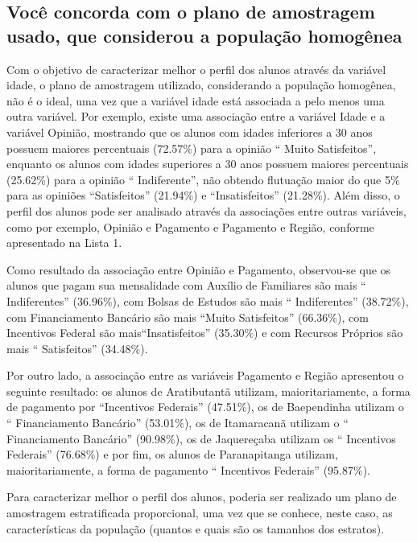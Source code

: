 \subsection{Você concorda com o plano de amostragem usado, que considerou a população homogênea}
	
	Com o objetivo de caracterizar melhor o perfil dos alunos através da
	variável idade, o plano de amostragem utilizado, considerando a
	população homogênea, não é o ideal, uma vez que a variável idade está
	associada a pelo menos uma outra variável. Por exemplo, existe uma
	associação entre a variável Idade e a variável Opinião, mostrando que os
	alunos com idades inferiores a 30 anos possuem maiores percentuais
	(\num{72,57}\%) para a opinião `` Muito Satisfeitos'', enquanto os 
    alunos com idades superiores
	a 30 anos possuem maiores percentuais (\num{25,62}\%) para a opinião
    `` Indiferente'', não obtendo flutuação
	maior do que 5\% para as opiniões ``Satisfeitos'' (\num{21,94}\%) 
    e ``Insatisfeitos'' (\num{21,28}\%). Além disso, o perfil dos
	alunos pode ser analisado através da associações entre outras variáveis,
	como por exemplo, Opinião e Pagamento e Pagamento e Região, conforme
	apresentado na Lista 1. 

	Como resultado da associação entre Opinião e Pagamento, observou-se que
	os alunos que pagam sua mensalidade com Auxílio de Familiares são mais
	`` Indiferentes'' (\num{36,96}\%), com Bolsas
	de Estudos são mais `` Indiferentes''
	(\num{38,72}\%), com Financiamento Bancário são mais ``Muito Satisfeitos''
    (\num{66,36}\%), com Incentivos Federal são mais``Insatisfeitos'' (\num{35,30}\%) e com
	Recursos Próprios são mais ``
	Satisfeitos'' (\num{34,48}\%).

	Por outro lado, a associação entre as variáveis Pagamento e Região
	apresentou o seguinte resultado: os alunos de Aratibutantã utilizam,
	maioritariamente, a forma de pagamento por ``Incentivos Federais''
    (\num{47,51}\%), os de Baependinha utilizam o
	`` Financiamento Bancário'' (\num{53,01}\%), os
	de Itamaracanã utilizam o `` Financiamento Bancário'' 
    (\num{90,98}\%), os de Jaquereçaba utilizam os
	`` Incentivos Federais'' (\num{76,68}\%) e por
	fim, os alunos de Paranapitanga utilizam, maioritariamente, a forma de
	pagamento `` Incentivos Federais'' (\num{95,87}\%). 

	Para caracterizar melhor o perfil dos alunos, poderia ser realizado um
	plano de amostragem estratificada proporcional, uma vez que se conhece,
	neste caso, as características da população (quantos e quais são os
	tamanhos dos estratos). 
